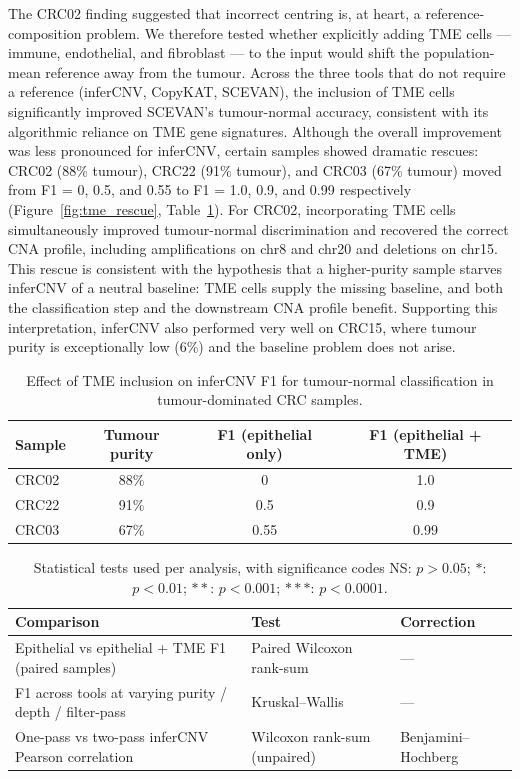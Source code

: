 \documentclass[11pt]{article}
\begin{document}
The CRC02 finding suggested that incorrect centring is, at heart, a
reference-composition problem. We therefore tested whether explicitly adding
TME cells --- immune, endothelial, and fibroblast --- to the input would
shift the population-mean reference away from the tumour. Across the three
tools that do not require a reference (inferCNV, CopyKAT, SCEVAN), the
inclusion of TME cells significantly improved SCEVAN's tumour-normal
accuracy, consistent with its algorithmic reliance on TME gene signatures.
Although the overall improvement was less pronounced for inferCNV, certain
samples showed dramatic rescues: CRC02 (88\% tumour), CRC22 (91\% tumour),
and CRC03 (67\% tumour) moved from F1 = 0, 0.5, and 0.55 to F1 = 1.0, 0.9,
and 0.99 respectively (Figure~\ref{fig:tme_rescue}, Table~\ref{tab:tme}).
For CRC02, incorporating TME cells simultaneously improved tumour-normal
discrimination and recovered the correct CNA profile, including
amplifications on chr8 and chr20 and deletions on chr15. This rescue is
consistent with the hypothesis that a higher-purity sample starves inferCNV
of a neutral baseline: TME cells supply the missing baseline, and both the
classification step and the downstream CNA profile benefit. Supporting this
interpretation, inferCNV also performed very well on CRC15, where tumour
purity is exceptionally low (6\%) and the baseline problem does not arise.

\begin{table}[htbp]
\centering
\caption{Effect of TME inclusion on inferCNV F1 for tumour-normal
classification in tumour-dominated CRC samples.}
\label{tab:tme}
\small
\begin{tabular}{lccc}
\toprule
Sample & Tumour purity & F1 (epithelial only) & F1 (epithelial + TME) \\
\midrule
CRC02 & 88\% & 0    & 1.0  \\
CRC22 & 91\% & 0.5  & 0.9  \\
CRC03 & 67\% & 0.55 & 0.99 \\
\bottomrule
\end{tabular}
\end{table}

\begin{table}[htbp]
\centering
\caption{Statistical tests used per analysis, with significance codes
NS: $p > 0.05$; $*$: $p < 0.01$; $**$: $p < 0.001$; $***$: $p < 0.0001$.}
\label{tab:stats}
\small
\begin{tabular}{lll}
\toprule
Comparison & Test & Correction \\
\midrule
Epithelial vs epithelial + TME F1 (paired samples) & Paired Wilcoxon rank-sum & --- \\
F1 across tools at varying purity / depth / filter-pass & Kruskal--Wallis    & --- \\
One-pass vs two-pass inferCNV Pearson correlation    & Wilcoxon rank-sum (unpaired) & Benjamini--Hochberg \\
\bottomrule
\end{tabular}
\end{table}
\end{document}
